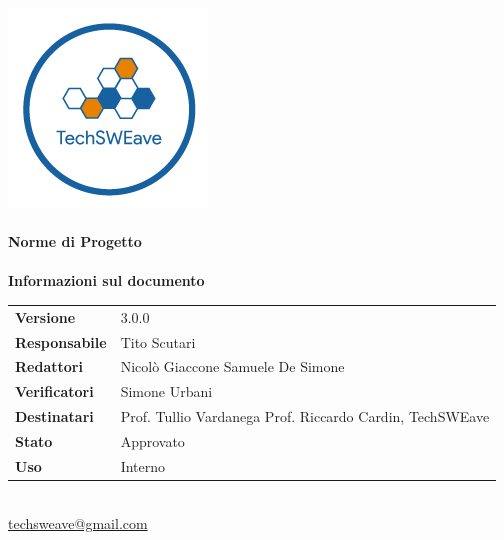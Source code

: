\documentclass[a4paper]{article}
\begin{document}
\begin{titlepage}
    \begin{center}
        \includegraphics{../../../Images/logo}\\
        \vspace{20px}
        \textcolor{logo}{\hrulefill}\\
        \vspace{20px}
        \textbf{\huge\textcolor{logo}{Norme di Progetto}}\\
        \vspace{10px}
        \textcolor{logo}{\hrulefill}\\
        \vspace{40px}
        \textbf{\Large Informazioni sul documento}\\
        \vspace{20px}
        \begin{tabular}{p{100px} | p{100px}}
            \textbf{Versione}     & 3.0.0                                                                      \\
            \textbf{Responsabile} & Tito Scutari                                                               \\
            \textbf{Redattori}    & Nicolò Giaccone \newline Samuele De Simone                                 \\
            \textbf{Verificatori} & Simone Urbani                                                              \\
            \textbf{Destinatari}  & Prof. Tullio Vardanega \newline Prof. Riccardo Cardin, \newline TechSWEave \\
            \textbf{Stato}        & Approvato                                                                  \\
            \textbf{Uso}          & Interno                                                                    \\
        \end{tabular}\\
        \vspace{60px}
        \href{mailto:techsweave@gmail.com}{techsweave@gmail.com}\\
    \end{center}
\end{titlepage}
\end{document}
